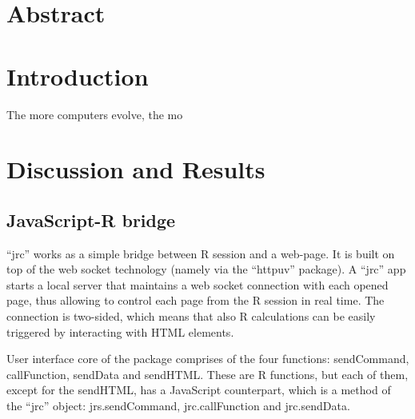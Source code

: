 \documentclass[twocolumn,10pt]{article}
\begin{document}
\setcounter{secnumdepth}{0}



\section{Abstract}

\section{Introduction}

The more computers evolve, the mo

\section{Discussion and Results}
\subsection{JavaScript-R bridge}

``jrc'' works as a simple bridge between R session and a web-page. It is built on top of the web socket technology (namely via the ``httpuv'' package). A ``jrc'' app starts a local server that maintains a web socket connection with each opened page, thus allowing to control each page from the R session in real time. The connection is two-sided, which means that also R calculations can be easily triggered by interacting with HTML elements.

User interface core of the package comprises of the four functions: sendCommand, callFunction, sendData and sendHTML. These are R functions, but each of them, except for the sendHTML, has a JavaScript counterpart, which is a method of the ``jrc'' object: jrs.sendCommand, jrc.callFunction and jrc.sendData. 
 
\end{document}
